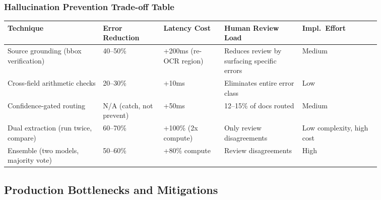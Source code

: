 \subsubsection*{Hallucination Prevention Trade-off Table}

\begin{tabular}{|p{0.22\linewidth}|p{0.14\linewidth}|p{0.14\linewidth}|p{0.18\linewidth}|p{0.18\linewidth}|}
\hline
\textbf{Technique} & \textbf{Error Reduction} & \textbf{Latency Cost} & \textbf{Human Review Load} & \textbf{Impl.\ Effort} \\
\hline
Source grounding (bbox verification) & 40--50\% & +200ms (re-OCR region) & Reduces review by surfacing specific errors & Medium \\
\hline
Cross-field arithmetic checks & 20--30\% & +10ms & Eliminates entire error class & Low \\
\hline
Confidence-gated routing & N/A (catch, not prevent) & +50ms & 12--15\% of docs routed & Medium \\
\hline
Dual extraction (run twice, compare) & 60--70\% & +100\% (2x compute) & Only review disagreements & Low complexity, high cost \\
\hline
Ensemble (two models, majority vote) & 50--60\% & +80\% compute & Review disagreements & High \\
\hline
\end{tabular}

\subsection*{Production Bottlenecks and Mitigations}

